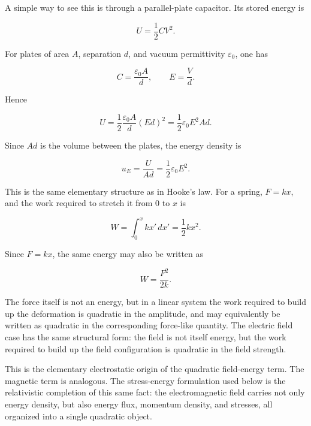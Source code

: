 \documentclass[11pt,a4paper]{article}
\begin{document}
A simple way to see this is through a parallel-plate capacitor. Its stored
energy is

\begin{equation}
U = \frac{1}{2}CV^2.
\end{equation}

For plates of area \(A\), separation \(d\), and vacuum permittivity
\(\varepsilon_0\), one has

\begin{equation}
C = \frac{\varepsilon_0 A}{d},
\qquad
E = \frac{V}{d}.
\end{equation}

Hence

\begin{equation}
U
=
\frac{1}{2}\frac{\varepsilon_0 A}{d}(Ed)^2
=
\frac{1}{2}\varepsilon_0 E^2 Ad.
\end{equation}

Since \(Ad\) is the volume between the plates, the energy density is

\begin{equation}
u_E
=
\frac{U}{Ad}
=
\frac{1}{2}\varepsilon_0 E^2.
\end{equation}

This is the same elementary structure as in Hooke's law. For a spring,
\(F=kx\), and the work required to stretch it from \(0\) to \(x\) is

\begin{equation}
W
=
\int_0^x kx'\,dx'
=
\frac{1}{2}kx^2.
\end{equation}

Since \(F=kx\), the same energy may also be written as

\begin{equation}
W
=
\frac{F^2}{2k}.
\end{equation}

The force itself is not an energy, but in a linear system the work required
to build up the deformation is quadratic in the amplitude, and may
equivalently be written as quadratic in the corresponding force-like
quantity. The electric field case has the same structural form: the field is
not itself energy, but the work required to build up the field configuration
is quadratic in the field strength.

This is the elementary electrostatic origin of the quadratic field-energy
term. The magnetic term is analogous. The stress-energy formulation used
below is the relativistic completion of this same fact: the electromagnetic
field carries not only energy density, but also energy flux, momentum density,
and stresses, all organized into a single quadratic object.
\end{document}
